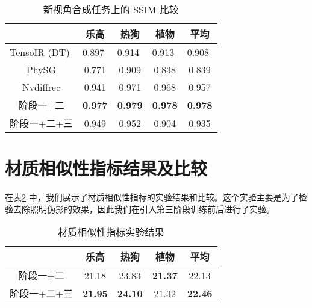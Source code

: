 \begin{table}[h]
  \centering
  \begin{tabular}{ccccc}
    \toprule
                                   & 乐高                        & 热狗                        & 植物                        & 平均                        \\
                                   \midrule
  \multicolumn{1}{l}{TensoIR (DT)} & \multicolumn{1}{l}{0.897} & \multicolumn{1}{l}{0.914} & \multicolumn{1}{l}{0.913} & \multicolumn{1}{l}{0.908} \\
  PhySG                            & 0.771                     & 0.909                     & 0.838                     & 0.839                     \\
  Nvdiffrec                        & 0.941                     & 0.971                     & 0.968                     & 0.957                     \\
  \midrule
  阶段一+二                            & \textbf{0.977}                     & \textbf{0.979}                     & \textbf{0.978}                     & \textbf{0.978}                     \\
  阶段一+二+三                          & 0.949                     & 0.952                     & 0.904                     & 0.935            \\

  \bottomrule
  \end{tabular}
  \caption{新视角合成任务上的 SSIM 比较}
  \label{tab:ssim}
\end{table}

\section{材质相似性指标结果及比较}

在表\ref{tab:mat} 中，我们展示了材质相似性指标的实验结果和比较。这个实验主要是为了检验去除照明伪影的效果，因此我们在引入第三阶段训练前后进行了实验。

\begin{table}[h]
  \centering
  \begin{tabular}{ccccc}
    \toprule
          & 乐高    & 热狗    & 植物    & 平均    \\
          \midrule
  阶段一+二   & 21.18 & 23.83 & \textbf{21.37} & 22.13 \\
  阶段一+二+三 & \textbf{21.95} & \textbf{24.10} & 21.32 & \textbf{22.46} \\
  \bottomrule
  \end{tabular}
  \caption{材质相似性指标实验结果}
  \label{tab:mat}
\end{table}

